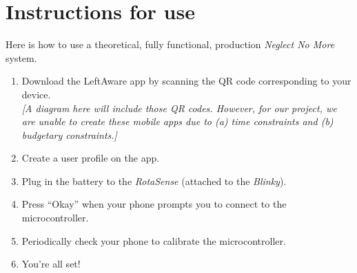 \chapter{Instructions for use}
\label{chap:use}

Here is how to use a theoretical, fully functional, production \textit{Neglect
  No More} system.

\begin{enumerate}
\item Download the LeftAware app by scanning the QR code corresponding to your device.\\
  \textit{[A diagram here will include those QR codes. However, for our
    project, we are unable to create these mobile apps due to (a) time
    constraints and (b) budgetary constraints.]}
\item Create a user profile on the app.
\item Plug in the battery to the \textit{RotaSense} (attached to the
  \textit{Blinky}).
\item Press ``Okay'' when your phone prompts you to connect to the
  microcontroller.
\item Periodically check your phone to calibrate the microcontroller.
\item You're all set!
\end{enumerate}


